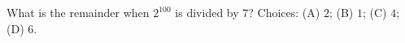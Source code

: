What is the remainder when $2^{100}$ is divided by $7$? Choices: (A) $2$; (B) $1$; (C) $4$; (D) $6$.
